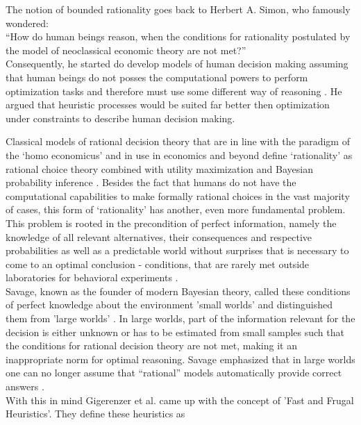 
The notion of bounded rationality goes back to Herbert A. Simon, who famously wondered: \\

``How do human beings reason, when the conditions for rationality postulated by the model of neoclassical economic theory are not met?''  \citep{simon1989scientist}\\

Consequently, he started do develop models of human decision making assuming that human beings do not posses the computational powers to perform optimization tasks and therefore must use some different way of reasoning \cite{simon1982models}. He argued that heuristic processes would be suited far better then optimization under constraints to describe human decision making.
 
Classical models of rational decision theory that are in line with the paradigm of the `homo economicus' and in use in economics and beyond define `rationality' as rational choice theory combined with utility maximization and Bayesian probability inference \cite{wilkinson2012introduction}.
Besides the fact that humans do not have the computational capabilities to make formally rational choices in the vast majority of cases, this form of `rationality' has another, even more fundamental problem. This problem is rooted in the precondition of perfect information, namely the knowledge of all relevant alternatives, their consequences and respective probabilities as well as a predictable world without surprises that is necessary to come to an optimal conclusion - conditions, that are rarely met outside laboratories for behavioral experiments \cite{Gigerenzer2011}.\\
Savage, known as the founder of modern Bayesian theory, called these conditions of perfect knowledge about the environment 'small worlds' and distinguished them from 'large worlds' \cite{savage1972foundations}. In large worlds, part of the information relevant for the decision is either unknown or has to be estimated from small samples such that the conditions for rational decision theory are not met, making it an inappropriate norm for optimal reasoning. Savage emphasized that in large worlds one can no longer assume that ``rational'' models automatically provide correct answers \cite{binmore2008rational}.\\
With this in mind Gigerenzer et al. came up with the concept of 'Fast and Frugal Heuristics'. They define these heuristics as
\\

